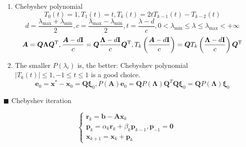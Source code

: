 \begin{enumerate}[label=$\bullet$]
\item Chebyshev polynomial
\begin{equation}
{T_0}\left( t \right) = 1,{T_1}\left( t \right) = t,{T_k}\left( t \right) = 2t{T_{k - 1}}\left( t \right) - {T_{k - 2}}\left( t \right)
\end{equation}
\begin{equation}
d = \frac{{{\lambda _{\max }} + {\lambda _{\min }}}}{2},c = \frac{{{\lambda _{\max }} - {\lambda _{\min }}}}{2},t = \frac{{\lambda  - d}}{c}, 0 < {\lambda _{\min }} \leqslant \lambda  \leqslant {\lambda _{\max }} <  + \infty 
\end{equation}
\begin{equation}
{\bm{A}} = {\bm{Q}}{\bm{\Lambda}} {{\bm{Q}}^{\rm{T}}},\frac{{{\bm{A}} - d{\bf{I}}}}{c} = {\bm{Q}}\frac{{{\bm{\Lambda}}  - d{\bf{I}}}}{c}{{\bm{Q}}^{\rm{T}}},{T_k}\left( {\frac{{{\bm{A}} - d{\bf{I}}}}{c}} \right) = {\bm{Q}} {T_k}\left( {\frac{{{\bm{\Lambda}}  - d{\bf{I}}}}{c}} \right){{\bm{Q}}^{\rm{T}}}
\end{equation}
\item The smaller $P \left( \lambda _i \right)$ is, the better: Chebyshev polynomial $\left| {{T_k}\left( t \right)} \right| \leqslant 1, - 1 \leqslant t \leqslant 1$ is a good choice.
\begin{equation}
{{\bm{e}}_0} = {{\bm{x}}^*} - {{\bm{x}}_0} = {\bm{Q}}{{\bm{\xi}} _0}, P\left( {\bm{A}} \right){{\bm{e}}_0} = {\bm{Q}}P\left( {\bm{\Lambda}}  \right){{\bm{Q}}^T}{\bm{Q}}{{\bm{\xi}} _0} = {\bm{Q}}P\left( {\bm{\Lambda}}  \right){{\bm{\xi}} _0}
\end{equation}
\end{enumerate}

\noindent $\blacksquare$ Chebyshev iteration

\begin{equation} \label{eq_chebyshev}
\left\{ {\begin{array}{c}
  {{{\bm{r}}_k} = {\bm{b}} - {\bm{A}}{{\bm{x}}_k}} \\ 
  {{{\bm{p}}_k} = {\alpha _k}{{\bm{r}}_k} + {\beta _k}{{\bm{p}}_{k - 1}}, {\bm{p}}_{-1} = {\bm{0}}} \\ 
  {{{\bm{x}}_{k + 1}} = {{\bm{x}}_k} + {{\bm{p}}_k}} 
\end{array}} \right.
\end{equation}

